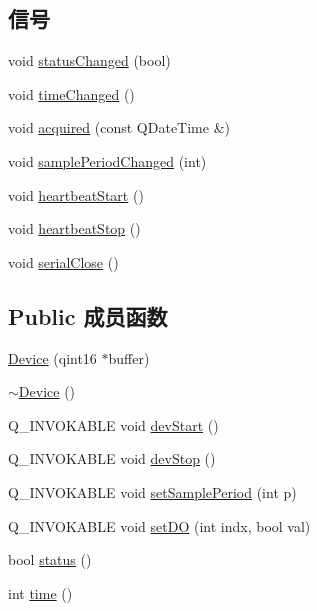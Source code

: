 \subsection*{信号}
\begin{DoxyCompactItemize}
\item 
void \hyperlink{class_device_a063dbe514cd12d635adbccf38bf4f53f}{status\+Changed} (bool)
\item 
void \hyperlink{class_device_a818f8350ab033557bfb72aef858a0ab7}{time\+Changed} ()
\item 
void \hyperlink{class_device_a1377620e47da1997d012cec27e3c72d4}{acquired} (const Q\+Date\+Time \&)
\item 
void \hyperlink{class_device_a74f0827f51383f85e0cab3ddb81ced4b}{sample\+Period\+Changed} (int)
\item 
void \hyperlink{class_device_afffd72adb7de79c6f9458e0140e04f0c}{heartbeat\+Start} ()
\item 
void \hyperlink{class_device_a0efcae038c0da76b43f9efab5314d200}{heartbeat\+Stop} ()
\item 
void \hyperlink{class_device_a8174b87c354c82e789569b87e7e2591e}{serial\+Close} ()
\end{DoxyCompactItemize}
\subsection*{Public 成员函数}
\begin{DoxyCompactItemize}
\item 
\hyperlink{class_device_acb29365c82264abd26b4cc3239e2fe61}{Device} (qint16 $\ast$buffer)
\item 
\hyperlink{class_device_a9dabc419c8d8df3a686c33ce042bc99a}{$\sim$\+Device} ()
\item 
Q\+\_\+\+I\+N\+V\+O\+K\+A\+B\+LE void \hyperlink{class_device_a68419c7c1d474721cce4f9a0a8b87ba0}{dev\+Start} ()
\item 
Q\+\_\+\+I\+N\+V\+O\+K\+A\+B\+LE void \hyperlink{class_device_a6f87ac6b1a5f7b9fd0fd73adccb460a2}{dev\+Stop} ()
\item 
Q\+\_\+\+I\+N\+V\+O\+K\+A\+B\+LE void \hyperlink{class_device_a4b8abc3bfacc59f46c699b5ead1ea8f8}{set\+Sample\+Period} (int p)
\item 
Q\+\_\+\+I\+N\+V\+O\+K\+A\+B\+LE void \hyperlink{class_device_a5d201e969696bc986fe1f540826e0a8e}{set\+DO} (int indx, bool val)
\item 
bool \hyperlink{class_device_a4953d696fd19d1b45d13dfc857d2bb13}{status} ()
\item 
int \hyperlink{class_device_a0cd70abff838a3fbe695ff74270bcbb5}{time} ()
\end{DoxyCompactItemize}
